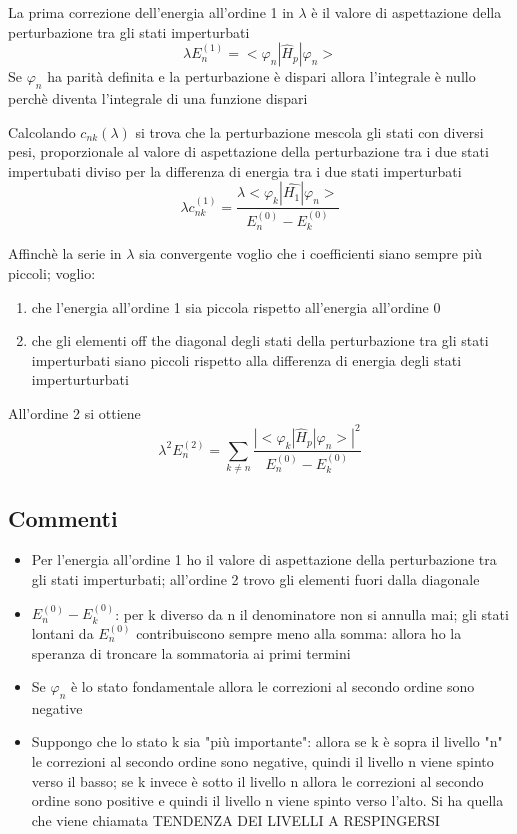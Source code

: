 \noindent La prima correzione dell'energia all'ordine 1 in \(\lambda\) è il valore di aspettazione della perturbazione tra gli stati imperturbati
\begin{equation*}
    \lambda E^{(1)}_n = <\varphi_n| \hat{H}_p | \varphi_n>
\end{equation*}
Se \(\varphi_n\) ha parità definita e la perturbazione è dispari allora l'integrale è nullo perchè diventa l'integrale di una funzione dispari 

\noindent Calcolando \(c_{nk}(\lambda)\) si trova che la perturbazione mescola gli stati con diversi pesi, proporzionale al valore di aspettazione della perturbazione tra i due stati impertubati diviso per la differenza di energia tra i due stati imperturbati
\begin{equation*}
    \lambda c_{nk}^{(1)} = \frac{\lambda < \varphi_k |\hat{H_1} | \varphi_n> }{E^{(0)}_n - E^{(0)}_k }
\end{equation*}

\noindent Affinchè la serie in \(\lambda\) sia convergente voglio che i coefficienti siano sempre più piccoli; voglio:
\begin{enumerate}
    \item che l'energia all'ordine 1 sia piccola rispetto all'energia all'ordine 0
    \item che gli elementi off the diagonal degli stati  della perturbazione tra gli stati imperturbati siano piccoli rispetto alla differenza di energia degli stati imperturturbati
\end{enumerate}

\noindent All'ordine 2 si ottiene 
\begin{equation*}
    \lambda^2 E^{(2)}_n = \sum_{k \neq n} \frac{{|<\varphi_k | \hat{H}_p | \varphi_n >|}^2}{E^{(0)}_n - E^{(0)}_k}
\end{equation*}

\subsection*{Commenti}

\begin{itemize}
    \item Per l'energia all'ordine 1 ho il valore di aspettazione della perturbazione tra gli stati imperturbati; all'ordine 2 trovo gli elementi fuori dalla diagonale
    \item \(E^{(0)}_n - E^{(0)}_k\): per k diverso da n il denominatore non si annulla mai; gli stati lontani da \(E^{(0)}_n\) contribuiscono sempre meno alla somma: allora ho la speranza di troncare la sommatoria ai primi termini
    \item Se \(\varphi_n\) è lo stato fondamentale allora le correzioni al secondo ordine sono negative 
    \item Suppongo che lo stato k sia "più importante": allora se k è sopra il livello "n" le correzioni al secondo ordine sono negative, quindi il livello n viene spinto verso il basso; se k invece è sotto il livello n allora le correzioni al secondo ordine sono positive e quindi il livello n viene spinto verso l'alto. Si ha quella che viene chiamata TENDENZA DEI LIVELLI A RESPINGERSI
\end{itemize}

